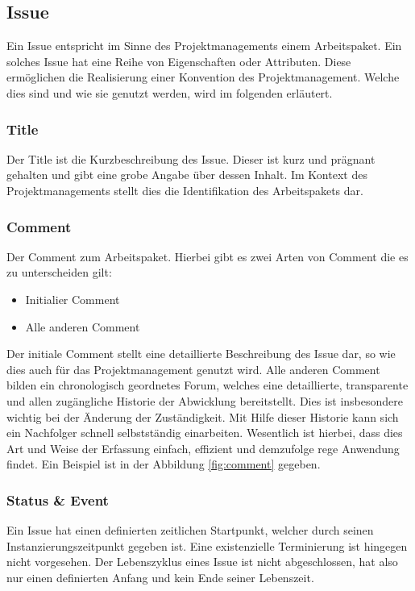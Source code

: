 \subsection{Issue}
Ein \gls{Issue} entspricht im Sinne des Projektmanagements einem Arbeitspaket.
Ein solches \gls{Issue} hat eine Reihe von Eigenschaften oder Attributen.
Diese ermöglichen die Realisierung einer Konvention des Projektmanagement.
Welche dies sind und wie sie genutzt werden, wird im folgenden erläutert.

\subsubsection{Title}
Der \gls{Title} ist die Kurzbeschreibung des \gls{Issue}. Dieser ist kurz und
prägnant gehalten und gibt eine grobe Angabe über dessen Inhalt. Im Kontext
des Projektmanagements stellt dies die Identifikation des Arbeitspakets dar.

\subsubsection{Comment}
Der \gls{Comment} zum Arbeitspaket. Hierbei gibt es zwei Arten von
\gls{Comment} die es zu unterscheiden gilt:

\begin{itemize}
	\item Initialier \gls{Comment}
	\item Alle anderen \gls{Comment}
\end{itemize}

Der initiale \gls{Comment} stellt eine detaillierte Beschreibung des
\gls{Issue} dar, so wie dies auch für das Projektmanagement genutzt wird.
Alle anderen \gls{Comment} bilden ein chronologisch geordnetes Forum,
welches eine detaillierte, transparente und allen zugängliche Historie der
Abwicklung bereitstellt. Dies ist insbesondere wichtig bei der Änderung der
Zuständigkeit. Mit Hilfe dieser Historie kann sich ein Nachfolger schnell
selbstständig einarbeiten. Wesentlich ist hierbei, dass dies Art und Weise
der Erfassung einfach, effizient und demzufolge rege Anwendung findet. Ein
Beispiel ist in der Abbildung \ref{fig:comment} gegeben.

\subsubsection{Status \& Event}
Ein \gls{Issue} hat einen definierten zeitlichen Startpunkt, welcher durch
seinen Instanzierungszeitpunkt gegeben ist. Eine existenzielle
Terminierung ist hingegen nicht vorgesehen. Der Lebenszyklus eines
\gls{Issue} ist nicht abgeschlossen, hat also nur einen definierten Anfang
und kein Ende seiner Lebenszeit.

